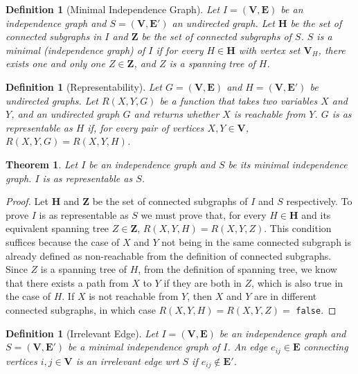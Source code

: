 \documentclass{amsart}
\theoremstyle{plain}
\newcounter{dummy-def}\numberwithin{dummy-def}{section}
\newtheorem{definition}[dummy-def]{Definition}
\newcounter{dummy-thm}\numberwithin{dummy-thm}{section}
\newtheorem{theorem}[dummy-thm]{Theorem}
\newcounter{dummy-prop}\numberwithin{dummy-prop}{section}
\newcounter{dummy-corollary}\numberwithin{dummy-corollary}{section}
\newcounter{dummy-lemma}\numberwithin{dummy-lemma}{section}
\newcounter{dummy-ex}\numberwithin{dummy-ex}{section}
\newcounter{dummy-eg}\numberwithin{dummy-eg}{section}
\numberwithin{equation}{section}
\newcommand{\set}[1]{\mathbf{#1}}
\begin{document}
\begin{definition}[Minimal Independence Graph] Let $I=(\set{V},\set{E})$ be an independence graph
  and $S=(\set{V},\set{E}')$ an undirected graph. Let $\set{H}$ be the set of connected subgraphs
  in $I$ and $\set{Z}$ be the set of connected subgraphs of $S$. $S$ is a minimal (independence
  graph) of $I$ if for every $H\in\set{H}$ with vertex set $\set{V}_H$, there exists one and only
  one $Z\in\set{Z}$, and $Z$ is a spanning tree of $H$.
\end{definition}

\begin{definition}[Representability] Let $G=(\set{V},\set{E})$ and $H=(\set{V},\set{E}')$ be
  undirected graphs. Let $R(X,Y,G)$ be a function that takes two variables $X$ and $Y$, and an
  undirected graph $G$ and returns whether $X$ is reachable from $Y$. $G$ is as representable as
  $H$ if, for every pair of vertices $X,Y \in\set{V}$, $R(X,Y,G)=R(X,Y,H)$.
\end{definition}

\begin{theorem} Let $I$ be an independence graph and $S$ be its minimal independence graph. $I$ is
  as representable as $S$.
\end{theorem}
\begin{proof}
  Let $\set{H}$ and $\set{Z}$ be the set of connected subgraphs of $I$ and $S$ respectively. To
  prove $I$ is as representable as $S$ we must prove that, for every $H\in\set{H}$ and its
  equivalent spanning tree $Z\in\set{Z}$, $R(X,Y,H)=R(X,Y,Z)$. This condition suffices because the
  case of $X$ and $Y$ not being in the same connected subgraph is already defined as non-reachable
  from the definition of connected subgraphs. Since $Z$ is a spanning tree of $H$, from the
  definition of spanning tree, we know that there exists a path from $X$ to $Y$ if they are both in
  $Z$, which is also true in the case of $H$. If $X$ is not reachable from $Y$, then $X$ and $Y$
  are in different connected subgraphs, in which case $R(X,Y,H)=R(X,Y,Z)=$ \texttt{false}.
\end{proof}

\begin{definition}[Irrelevant Edge] Let $I=(\set{V},\set{E})$ be an independence graph and
  $S=(\set{V},\set{E}')$ be a minimal independence graph of $I$. An edge $e_{ij}\in\set{E}$
  connecting vertices $i,j\in\set{V}$ is an irrelevant edge wrt $S$ if $e_{ij}\not\in\set{E}'$.
\end{definition}
\end{document}
